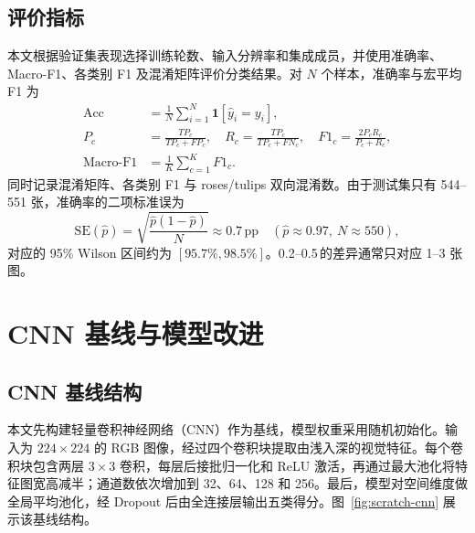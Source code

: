 \documentclass[11pt,a4paper,UTF8,fontset=windows]{ctexart}
\newcommand{\pp}{\,\text{pp}}
\begin{document}
\subsection{评价指标}



本文根据验证集表现选择训练轮数、输入分辨率和集成成员，并使用准确率、Macro-F1、各类别 F1 及混淆矩阵评价分类结果。对 $N$ 个样本，准确率与宏平均 F1 为
\begin{align}
\mathrm{Acc} &= \frac{1}{N}\sum_{i=1}^{N}\mathbf{1}[\hat{y}_{i}=y_{i}], \label{eq:acc}\\
P_{c} &= \frac{TP_{c}}{TP_{c}+FP_{c}},\quad
R_{c}=\frac{TP_{c}}{TP_{c}+FN_{c}},\quad
F1_{c}=\frac{2P_{c}R_{c}}{P_{c}+R_{c}}, \label{eq:f1}\\
\mathrm{Macro\text{-}F1} &= \frac{1}{K}\sum_{c=1}^{K}F1_{c}. \label{eq:macro}
\end{align}
同时记录混淆矩阵、各类别 F1 与 roses/tulips 双向混淆数。由于测试集只有 544--551 张，准确率的二项标准误为
\begin{equation}
\mathrm{SE}(\hat{p})=\sqrt{\frac{\hat{p}(1-\hat{p})}{N}}\approx 0.7\pp
\quad(\hat{p}\approx0.97,\ N\approx550),
\label{eq:se}
\end{equation}
对应的 95\% Wilson 区间约为 $[95.7\%,98.5\%]$。0.2--0.5\pp 的差异通常只对应 1--3 张图。

\section{CNN 基线与模型改进}
\label{sec:scratch}
\subsection{CNN 基线结构}

本文先构建轻量卷积神经网络（CNN）作为基线，模型权重采用随机初始化。输入为 $224\times224$ 的 RGB 图像，经过四个卷积块提取由浅入深的视觉特征。每个卷积块包含两层 $3\times3$ 卷积，每层后接批归一化和 ReLU 激活，再通过最大池化将特征图宽高减半；通道数依次增加到 32、64、128 和 256。最后，模型对空间维度做全局平均池化，经 Dropout 后由全连接层输出五类得分。图~\ref{fig:scratch-cnn} 展示该基线结构。
\end{document}
